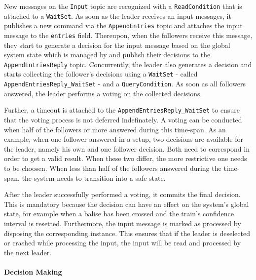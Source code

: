 New messages on the \texttt{Input} topic are recognized with a \texttt{ReadCondition} that is attached to a \texttt{WaitSet}.
As soon as the leader receives an input messages, it publishes a new command via the \texttt{AppendEntries} topic and attaches the input message to the \texttt{entries} field.
Thereupon, when the followers receive this message, they start to generate a decision for the input message based on the global system state which is managed by  and publish their decisions to the \texttt{AppendEntriesReply} topic.
Concurrently, the leader also generates a decision and starts collecting the follower's decisions using a \texttt{WaitSet} - called \texttt{AppendEntriesReply\_WaitSet} - and a \texttt{QueryCondition}.
As soon as all followers answered, the leader performs a voting on the collected decisions.

Further, a timeout is attached to the \texttt{AppendEntriesReply\_WaitSet} to ensure that the voting process is not deferred indefinately.
A voting can be conducted when half of the followers or more answered during this time-span.
As an example, when one follower answered in a  setup, two decisions are available for the leader, namely his own and one follower decision.
Both need to correspond in order to get a valid result.
When these two differ, the more restrictive one needs to be choosen.
When less than half of the followers answered during the time-span, the system needs to transition into a safe state.

After the leader successfully performed a voting, it commits the final decision.
This is mandatory because the decision can have an effect on the system's global state, for example when a balise has been crossed and the train's confidence interval is resetted.
Furthermore, the input message is marked as processed by disposing the corresponding  instance.
This ensures that if the leader is deselected or crashed while processing the input, the input will be read and processed by the next leader.

\paragraph{Decision Making}


